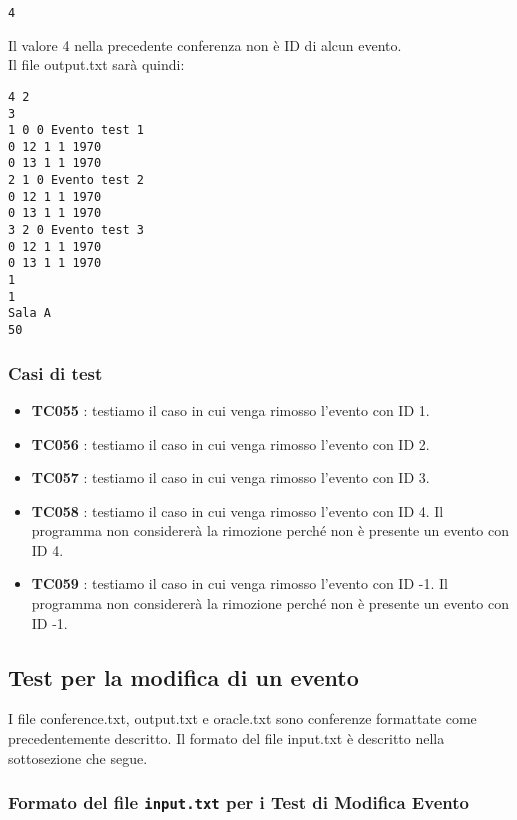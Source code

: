 \documentclass[11pt]{scrartcl} %
\begin{document}
\begin{lstlisting}
4
\end{lstlisting}
Il valore 4 nella precedente conferenza non è ID di alcun evento.\\
Il file output.txt sarà quindi:

\begin{lstlisting}
4 2
3
1 0 0 Evento test 1
0 12 1 1 1970
0 13 1 1 1970
2 1 0 Evento test 2
0 12 1 1 1970
0 13 1 1 1970
3 2 0 Evento test 3
0 12 1 1 1970
0 13 1 1 1970
1
1
Sala A
50
\end{lstlisting}


\subsubsection{Casi di test}
\begin{itemize}

	\item \textbf{TC055} : testiamo il caso in cui venga rimosso l'evento con ID 1.

	\item \textbf{TC056} : testiamo il caso in cui venga rimosso l'evento con ID 2.

	\item \textbf{TC057} : testiamo il caso in cui venga rimosso l'evento con ID 3.

	\item \textbf{TC058} : testiamo il caso in cui venga rimosso l'evento con ID 4. Il programma non considererà la rimozione perché non è presente un evento con ID 4.

	\item \textbf{TC059} : testiamo il caso in cui venga rimosso l'evento con ID -1. Il programma non considererà la rimozione perché non è presente un evento con ID -1.

\end{itemize}

\subsection{Test per la modifica di un evento}

I file conference.txt, output.txt e oracle.txt sono conferenze formattate come precedentemente descritto. Il formato del file input.txt è descritto nella sottosezione che segue.

\subsubsection{Formato del file \texttt{input.txt} per i Test di Modifica Evento}
\end{document}
